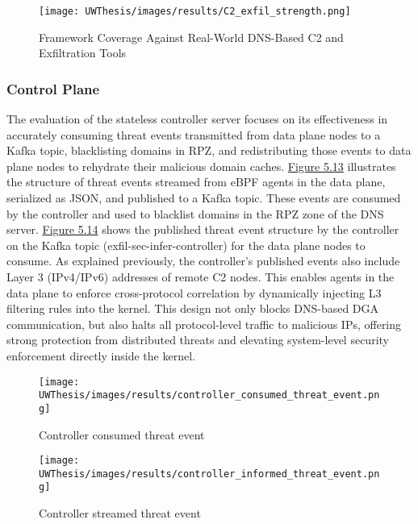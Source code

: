 \documentclass [11pt, proquest] {uwthesis}[2020/02/24]
\begin{document}
\newpage
\begin{figure}[H]
  \texttt{[image: UWThesis/images/results/C2\_exfil\_strength.png]}
  \caption{Framework Coverage Against Real-World DNS-Based C2 and Exfiltration Tools}
\label{tab:dns-framework-coverage}
\end{figure}

\vspace{-25pt}
\subsubsection{Control Plane}
The evaluation of the stateless controller server focuses on its effectiveness in accurately consuming threat events transmitted from data plane nodes to a Kafka topic, blacklisting domains in RPZ, and redistributing those events to data plane nodes to rehydrate their malicious domain caches. \hyperref[fig:controller_metric]{Figure 5.13} illustrates the structure of threat events streamed from eBPF agents in the data plane, serialized as JSON, and published to a Kafka topic. These events are consumed by the controller and used to blacklist domains in the RPZ zone of the DNS server. \hyperref[fig:controller_aware_metric]{Figure 5.14} shows the published threat event structure by the controller on the Kafka topic (exfil-sec-infer-controller) for the data plane nodes to consume. As explained previously, the controller’s published events also include Layer 3 (IPv4/IPv6) addresses of remote C2 nodes. This enables agents in the data plane to enforce cross-protocol correlation by dynamically injecting L3 filtering rules into the kernel. This design not only blocks DNS-based DGA communication, but also halts all protocol-level traffic to malicious IPs, offering strong protection from distributed threats and elevating system-level security enforcement directly inside the kernel.


\begin{figure}[H]
  \centering
  \begin{minipage}[t]{0.47\textwidth}
    \centering
    \texttt{[image: UWThesis/images/results/controller\_consumed\_threat\_event.png]}
\caption{Controller consumed threat event}
  \label{fig:controller_metric}
  \end{minipage}
  \hfill
  \begin{minipage}[t]{0.47\textwidth}
    \centering
    \texttt{[image: UWThesis/images/results/controller\_informed\_threat\_event.png]}
    \caption{Controller streamed threat event}
     \label{fig:controller_aware_metric}
  \end{minipage}
\end{figure}
\end{document}
